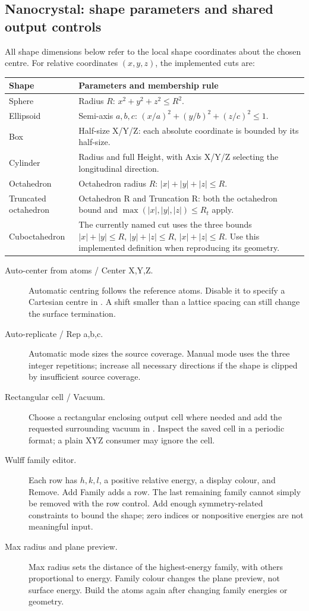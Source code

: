 \subsection{Nanocrystal: shape parameters and shared output controls}
All shape dimensions below refer to the local shape coordinates about the chosen centre. For relative coordinates $(x,y,z)$, the implemented cuts are:
\begin{longtable}{p{.24\linewidth}p{.67\linewidth}}
\toprule Shape & Parameters and membership rule \\ \midrule\endhead
Sphere & Radius $R$: $x^2+y^2+z^2\leq R^2$. \\
Ellipsoid & Semi-axis $a,b,c$: $(x/a)^2+(y/b)^2+(z/c)^2\leq1$. \\
Box & Half-size X/Y/Z: each absolute coordinate is bounded by its half-size. \\
Cylinder & Radius and full Height, with Axis X/Y/Z selecting the longitudinal direction. \\
Octahedron & Octahedron radius $R$: $|x|+|y|+|z|\leq R$. \\
Truncated octahedron & Octahedron R and Truncation R: both the octahedron bound and $\max(|x|,|y|,|z|)\leq R_t$ apply. \\
Cuboctahedron & The currently named cut uses the three bounds $|x|+|y|\leq R$, $|y|+|z|\leq R$, $|x|+|z|\leq R$. Use this implemented definition when reproducing its geometry. \\
\bottomrule
\end{longtable}
\begin{description}
\item[Auto-center from atoms / Center X,Y,Z.] Automatic centring follows the reference atoms. Disable it to specify a Cartesian centre in \angstrom. A shift smaller than a lattice spacing can still change the surface termination.
\item[Auto-replicate / Rep a,b,c.] Automatic mode sizes the source coverage. Manual mode uses the three integer repetitions; increase all necessary directions if the shape is clipped by insufficient source coverage.
\item[Rectangular cell / Vacuum.] Choose a rectangular enclosing output cell where needed and add the requested surrounding vacuum in \angstrom. Inspect the saved cell in a periodic format; a plain XYZ consumer may ignore the cell.
\item[Wulff family editor.] Each row has $h,k,l$, a positive relative energy, a display colour, and Remove. Add Family adds a row. The last remaining family cannot simply be removed with the row control. Add enough symmetry-related constraints to bound the shape; zero indices or nonpositive energies are not meaningful input.
\item[Max radius and plane preview.] Max radius sets the distance of the highest-energy family, with others proportional to energy. Family colour changes the plane preview, not surface energy. Build the atoms again after changing family energies or geometry.
\end{description}

